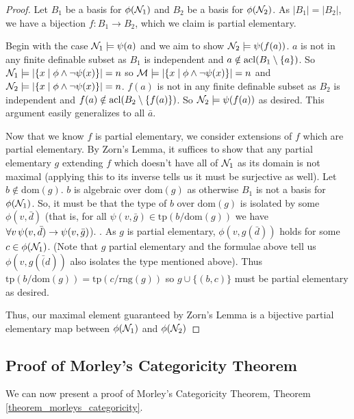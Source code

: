 \begin{proof}
Let \(B_1\) be a basis for \(\phi(\mathcal{N}_1)\) and \(B_2\) be a basis for \(\phi(\mathcal{N}_2)\).
As \(|B_1| = |B_2|\), we have a bijection \(f: B_1 \to B_2\), which we claim is partial elementary. 

Begin with the case \(\mathcal{N}_1 \models \psi(a)\) and we aim to show \(\mathcal{N}_2 \models \psi(f(a))\).
\(a\) is not in any finite definable subset as \(B_1\) is independent and \(a \notin \text{acl}(B_1 \setminus\{a\})\). 
So \(\mathcal{N}_1 \models |\{x \mid \phi \land \neg \psi(x)\}| = n\) so \(\mathcal{M} \models |\{x \mid \phi \land \neg \psi(x)\}| = n\)
and \(\mathcal{N}_2 \models |\{x \mid \phi \land \neg \psi(x)\}| = n\).
\(f(a)\) is not in any finite definable subset as \(B_2\) is independent and \(f(a) \notin \text{acl}(B_2 \setminus\{f(a)\})\). 
So \(\mathcal{N}_2 \models \psi(f(a))\) as desired. 
This argument easily generalizes to all \(\bar{a}\). 

Now that we know \(f\) is partial elementary, we consider extensions of \(f\) which are partial elementary. 
By Zorn's Lemma, it suffices to show that any partial elementary \(g\) extending \(f\) which doesn't have all of \(\mathcal{N}_1\) as its domain is not maximal (applying this to its inverse tells us it must be surjective as well).
Let \(b \notin \text{dom}(g)\). 
\(b\) is algebraic over \(\text{dom}(g)\) as otherwise \(B_1\) is not a basis for \(\phi(\mathcal{N}_1)\). 
So, it must be that the type of \(b\) over \(\text{dom}(g)\) is isolated by some \(\phi(v, \bar{d})\) (that is, for all \(\psi(v, \bar{g}) \in \text{tp}(b/\text{dom}(g))\) we have \(\forall v \, \psi(v, \bar{d}) \to \psi(v, \bar{g})\)). .
As \(g\) is partial elementary, \(\phi(v, g(\bar{d}))\) holds for some \(c \in \phi(\mathcal{N}_1)\). 
(Note that \(g\) partial elementary and the formulae above tell us \(\phi(v, g(\bar(d))\) also isolates the type mentioned above).
Thus \(\text{tp}(b/\text{dom}(g)) = \text{tp}(c/\text{rng}(g))\) so \(g \cup \{(b, c)\}\) must be partial elementary as desired. 

Thus, our maximal element guaranteed by Zorn's Lemma is a bijective partial elementary map between \(\phi(\mathcal{N}_1)\) and  \(\phi(\mathcal{N}_2)\)
\end{proof}

\subsection{Proof of Morley's Categoricity Theorem}

We can now present a proof of Morley's Categoricity Theorem, Theorem \ref{theorem_morleys_categoricity}.

